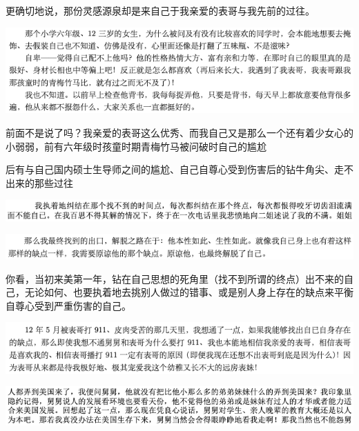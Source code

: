 \documentclass[9pt, b5paper]{article}
\begin{document}
更确切地说，那份灵感源泉却是来自己于我亲爱的表哥与我先前的过往。 

\begin{center}
\includegraphics[width=.9\linewidth]{./pic/backups_plans_20210424_112502.png}
\end{center}

前面不是说了吗？我亲爱的表哥这么优秀、而我自己又是那么一个还有着少女心的小弱弱，前有六年级时孩童时期青梅竹马被问破时自己的尴尬

后有与自己国内硕士生导师之间的尴尬、自己自尊心受到伤害后的钻牛角尖、走不出来的那些过往

\begin{center}
\includegraphics[width=.9\linewidth]{./pic/backups_plans_20210424_085829.png}
\end{center}

\begin{center}
\includegraphics[width=.9\linewidth]{./pic/backups_plans_20210424_091759.png}
\end{center}

你看，当初来美第一年，钻在自己思想的死角里（找不到所谓的终点）出不来的自己，无论如何、也要执着地去挑别人做过的错事、或是别人身上存在的缺点来平衡自尊心受到严重伤害的自己。

\begin{center}
\includegraphics[width=.9\linewidth]{./pic/backups_plans_20210424_085705.png}
\end{center}

\begin{center}
\includegraphics[width=.9\linewidth]{./pic/backups_plans_20210424_091947.png}
\end{center}
\end{document}
